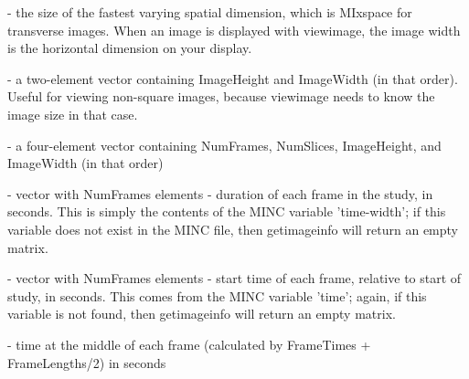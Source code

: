 \begin{description}
\item {}   - the size of the fastest varying spatial
                     dimension, which is MIxspace for transverse
                     images.  When an image is displayed with
                     viewimage, the image width is the horizontal
                     dimension on your display.
\end{description}
 
\begin{description}
\item {}    - a two-element vector containing ImageHeight and
                     ImageWidth (in that order).  Useful for viewing 
                     non-square images, because viewimage needs to know
                     the image size in that case.
\end{description}
 
\begin{description}
\item {}     - a four-element vector containing NumFrames, NumSlices,
                     ImageHeight, and ImageWidth (in that order)
\end{description}
 
\begin{description}
\item {} - vector with NumFrames elements - duration of
                     each frame in the study, in seconds.  This is
                     simply the contents of the MINC variable
                     'time-width'; if this variable does not exist in
                     the MINC file, then getimageinfo will return an
                     empty matrix.
\end{description}
 
\begin{description}
\item {}   - vector with NumFrames elements - start time of
                     each frame, relative to start of study, in
                     seconds.  This comes from the MINC variable
                     'time'; again, if this variable is not found,
                     then getimageinfo will return an empty matrix.
\end{description}
 
\begin{description}
\item {} - time at the middle of each frame (calculated by
                      FrameTimes + FrameLengths/2) in seconds
\end{description}
       
